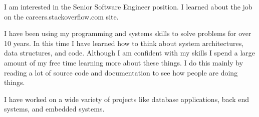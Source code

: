 \documentclass[12pt]{article}
\begin{document}
I am interested in the Senior Software Engineer position.  I learned
about the job on the careers.stackoverflow.com site.

I have been using my programming and systems skills to solve problems
for over 10 years.  In this time I have learned how to think about system
architectures, data structures, and code.  Although I am confident with
my skills I spend a large amount of my free time learning more about
these things.  I do this mainly by reading a lot of source code and
documentation to see how people are doing things.

I have worked on a wide variety of projects like database applications,
back end systems, and embedded systems.
\end{document}
